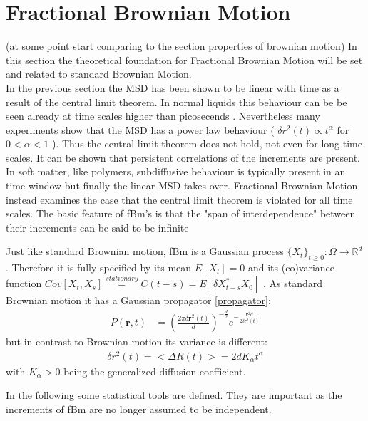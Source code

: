 \documentclass[
  a4paper,BCOR10mm,oneside,
  bibtotoc,idxtotoc,
  headsepline,footsepline,%
  fleqn,openbib
]{scrbook}
\begin{document}
\section{Fractional Brownian Motion}
(at some point start comparing to the section properties of brownian motion)
In this section the theoretical foundation for Fractional Brownian Motion will be set and related to standard Brownian Motion. \\
In the previous section the MSD has been shown to be linear with time as a result of the central limit theorem. In normal liquids this behaviour can be be seen already at time scales higher than picosecends \cite{Hofling2013}. Nevertheless many experiments show that the MSD has a power law behaviour ( $\delta r ^2 (t) \propto t^{\alpha}$ for  $0 < \alpha < 1$ ). Thus the central limit theorem does not hold, not even for long time scales. It can be shown that persistent correlations of the increments are present. In soft matter, like polymers, subdiffusive behaviour is typically present in an time window but finally the linear MSD takes over. Fractional Brownian Motion instead examines the case that the central limit theorem is violated for all time scales. The basic feature of fBm's is that the "span of interdependence" between their increments can be said to be infinite\cite{Mandelbrot1968}\\
\begin{mydef}
Just like standard Brownian motion, fBm is a Gaussian process $\{X_t\}_{t\geq0}: \Omega \rightarrow \mathbb{R}^d$. Therefore it is fully specified by its mean $E[X_t]=0$ and its (co)variance function $Cov[X_t,X_s]\stackrel{stationary} {=}C(t-s)=E[\delta X_{t-s}^* X_{0}]$ . As standard Brownian motion it has a Gaussian propagator \ref{propagator}: 
\begin{align*}
P(\bm{r},t)&=  \left(\frac{2 \pi \delta \bm{r}^2(t)}{d}\right)^{- \frac{d}{2}} e^{- \frac{\bm{r}^2 d}{2 \delta \bm{r}^2(t)}} 
\end{align*}
but in contrast to Brownian motion its variance is different:
\begin{align*}
\delta r^{2}(t)= < \Delta R(t)>=2dK_{\alpha}t^{\alpha}
\end{align*}
with $K_{\alpha}>0$  being the generalized diffusion coefficient.
\end{mydef}
In the following some statistical tools are defined. They are important as the increments of fBm are no longer assumed to be independent. 
\end{document}
